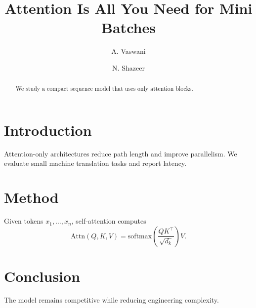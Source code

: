 \documentclass[sigconf]{acmart}
\begin{document}
\title{Attention Is All You Need for Mini Batches}
\author{A. Vaswani}
\author{N. Shazeer}
\begin{abstract}
We study a compact sequence model that uses only attention blocks.
\end{abstract}
\renewcommand\footnotetextcopyrightpermission[1]{}
\maketitle
\thispagestyle{plain}
\pagestyle{plain}
\section{Introduction}
Attention-only architectures reduce path length and improve parallelism.
We evaluate small machine translation tasks and report latency.

\FloatBarrier
\section{Method}
Given tokens $x_1,\dots,x_n$, self-attention computes
\begin{equation}
\mathrm{Attn}(Q,K,V)=\mathrm{softmax}\left(\frac{QK^\top}{\sqrt{d_k}}\right)V.
\end{equation}

\FloatBarrier
\section{Conclusion}
The model remains competitive while reducing engineering complexity.

\FloatBarrier


\end{document}
